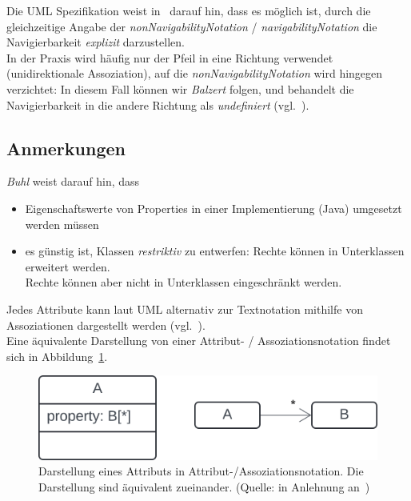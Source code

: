 \begin{tcolorbox}[title=Angabe der Navigierbarkeit,colback=white]
    Die UML Spezifikation weist in~\cite[203]{OMG17} darauf hin, dass es möglich ist, durch die gleichzeitige Angabe der \textit{nonNavigabilityNotation} / \textit{navigabilityNotation} die Navigierbarkeit \textit{explizit} darzustellen.\\
    In der Praxis wird häufig nur der Pfeil in eine Richtung verwendet (unidirektionale Assoziation), auf die \textit{nonNavigabilityNotation} wird hingegen verzichtet: In diesem Fall können wir \textit{Balzert} folgen, und behandelt die Navigierbarkeit in die andere Richtung als \textit{undefiniert} (vgl.~\cite[285]{Bal05}).
\end{tcolorbox}

\subsection*{Anmerkungen}
\textit{Buhl} weist darauf hin, dass

\begin{itemize}
    \item Eigenschaftswerte von Properties in einer Implementierung (Java) umgesetzt werden müssen
    \item es günstig ist, Klassen \textit{restriktiv} zu entwerfen: Rechte können in Unterklassen erweitert werden.\\
    Rechte können aber nicht in Unterklassen eingeschränkt werden.
\end{itemize}

\begin{tcolorbox}[title=Attribut- vs. Assoziationsnotation,colback=white]
    Jedes Attribute kann laut UML alternativ zur Textnotation mithilfe von Assoziationen dargestellt werden (vgl.~\cite[264]{Bal05}).\\
    Eine äquivalente Darstellung von einer Attribut- / Assoziationsnotation findet sich in Abbildung~\ref{fig:attassocequiv}.
\end{tcolorbox}


\begin{figure}
    \centering
    \includegraphics[scale=0.5]{part three/Klassendiagramme/img/attassocequiv}
    \caption{Darstellung eines Attributs in Attribut-/Assoziationsnotation. Die Darstellung sind äquivalent zueinander. (Quelle: in Anlehnung an~\cite[Abb. 6.2-4, 264]{Bal05})}
    \label{fig:attassocequiv}
\end{figure}


